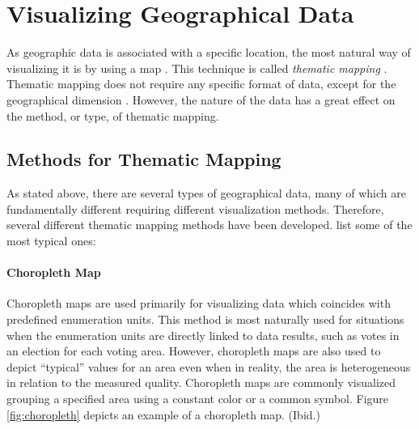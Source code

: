 \section{Visualizing Geographical Data}

As geographic data is associated with a specific location, the most natural way of visualizing it is by using a map \citep[chap.~1]{kraak_cartographic_1998,kraak_cartography_2011}. This technique is called \emph{thematic mapping} \citep[chap.~1]{slocum_thematic_2014}. Thematic mapping does not require any specific format of data, except for the geographical dimension \citep[chap.~1]{kraak_cartography_2011}. However, the nature of the data has a great effect on the method, or type, of thematic mapping.

\subsection{Methods for Thematic Mapping}
\label{subsection:mappingmethods}

As stated above, there are several types of geographical data, many of which are fundamentally different requiring different visualization methods. Therefore, several different thematic mapping methods have been developed. \citet[chap.~14-18]{slocum_thematic_2014} list some of the most typical ones:

\paragraph{Choropleth Map}

Choropleth maps are used primarily for visualizing data which coincides with predefined enumeration units. This method is most naturally used for situations when the enumeration units are directly linked to data results, such as votes in an election for each voting area. However, choropleth maps are also used to depict ``typical'' values for an area even when in reality, the area is heterogeneous in relation to the measured quality. Choropleth maps are commonly visualized grouping a specified area using a constant color or a common symbol. Figure \ref{fig:choropleth} depicts an example of a choropleth map. (Ibid.)

